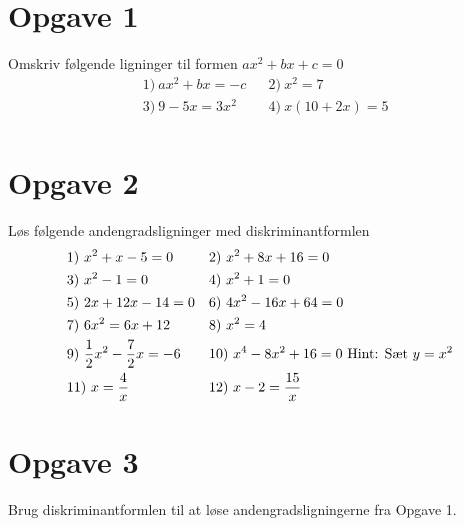 \documentclass[12pt]{article}
\begin{document}
\section*{Opgave 1}
Omskriv følgende ligninger til formen $ax^2+bx+c = 0$
\begin{align*}
&1) \ ax^2+bx = -c   &&2) \  x^2=7  \\
&3) \ 9-5x=3x^2   &&4) \ x(10+2x)=5   \\
\end{align*}
\section*{Opgave 2}
Løs følgende andengradsligninger med diskriminantformlen
\begin{align*}
&1) \ x^2+x-5 =0   &&2) \  x^2+8x+16 = 0  \\
&3) \ x^2-1 = 0  &&4) \ x^2+1=0  \\
&5) \ 2x+12x-14=0 &&6) \  4x^2-16x+64=0   \\
&7) \  6x^2=6x+12  &&8) \  x^2=4  \\
&9) \  \frac{1}{2}x^2 -\frac{7}{2}x=-6  &&10) \ x^4 - 8x^2+16 =0 \textnormal{ Hint: Sæt } y=x^2   \\
&11) \  x = \frac{4}{x}  && 12) \    x-2 = \frac{15}{x}   
\end{align*}


\section*{Opgave 3}
Brug diskriminantformlen til at løse andengradsligningerne fra Opgave 1.
\end{document}
